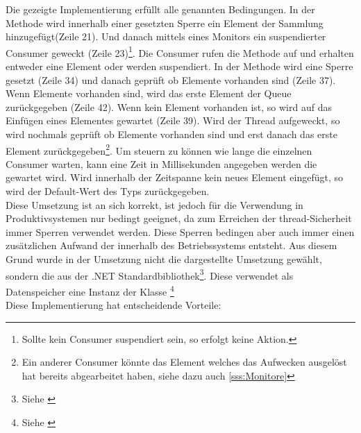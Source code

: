 Die gezeigte Implementierung erfüllt alle genannten Bedingungen. In der Methode  wird innerhalb einer gesetzten Sperre ein Element der Sammlung hinzugefügt(Zeile 21). Und danach mittels eines Monitors ein suspendierter Consumer geweckt (Zeile 23)\footnote{Sollte kein Consumer suspendiert sein, so erfolgt keine Aktion.}. 
Die Consumer rufen die Methode  auf und erhalten entweder eine Element oder werden suspendiert. In der Methode wird eine Sperre gesetzt (Zeile 34) und danach geprüft ob Elemente vorhanden sind (Zeile 37). Wenn Elemente vorhanden sind, wird das erste Element der Queue zurückgegeben (Zeile 42). Wenn kein Element vorhanden ist, so wird auf das Einfügen eines Elementes gewartet (Zeile 39). Wird der Thread aufgeweckt, so wird nochmals geprüft ob Elemente vorhanden sind und erst danach das erste Element zurückgegeben\footnote{Ein anderer Consumer könnte das Element welches das Aufwecken ausgelöst hat bereits abgearbeitet haben, siehe dazu auch \ref{sss:Monitore}}. Um steuern zu können wie lange die einzelnen Consumer warten, kann eine Zeit in Millisekunden angegeben werden die gewartet wird. Wird innerhalb der Zeitspanne kein neues Element eingefügt, so wird der Default-Wert des Typs zurückgegeben.
\\Diese Umsetzung ist an sich korrekt, ist jedoch für die Verwendung in Produktivsystemen nur bedingt geeignet, da zum Erreichen der thread-Sicherheit immer Sperren verwendet werden. Diese Sperren bedingen aber auch immer einen zusätzlichen Aufwand der innerhalb des Betriebssystems entsteht. Aus diesem Grund wurde in der Umsetzung nicht die dargestellte Umsetzung gewählt, sondern die  aus der .NET Standardbibliothek\footnote{Siehe \parencite{ms_blockingcollection}}. Diese verwendet als Datenspeicher eine Instanz der Klasse  \footnote{Siehe \parencite{ms_concurrentq}} 
\\Diese Implementierung hat entscheidende Vorteile:
